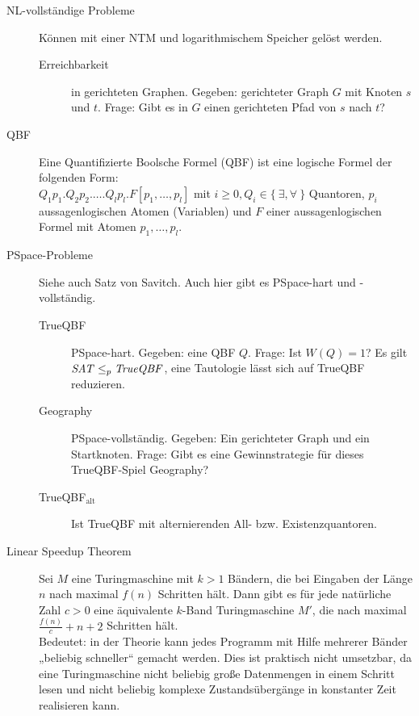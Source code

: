 \begin{description}
        \item[NL-vollständige Probleme] Können mit einer NTM und logarithmischem Speicher gelöst werden.
            \begin{description}
                \item[Erreichbarkeit] in gerichteten Graphen. Gegeben: gerichteter Graph $G$ mit Knoten $s$ und $t$. Frage: Gibt es in $G$ einen gerichteten Pfad von $s$ nach $t$?
            \end{description}

        \item[QBF] Eine Quantifizierte Boolsche Formel (QBF) ist eine logische Formel der folgenden Form: \\
            $Q_{1}p_{1}.Q_{2}p_{2}.\dots.Q_{l}p_{l}.F[p_{1},\dots,p_{l}]$ mit $i \geq 0, Q_{i} \in \{\ \exists, \forall\ \}$ Quantoren, $p_{i}$ aussagenlogischen Atomen (Variablen) und $F$ einer aussagenlogischen Formel mit Atomen $p_{1},\dots,p_{l}$. 

        \item[PSpace-Probleme] Siehe auch Satz von Savitch. Auch hier gibt es PSpace-hart und -vollständig. 
            \begin{description}
                \item[TrueQBF] PSpace-hart. Gegeben: eine QBF $Q$. Frage: Ist $W(Q) = 1$? Es gilt $\mathit{SAT} \leq_{p} \mathit{TrueQBF}$, eine Tautologie lässt sich auf TrueQBF reduzieren.
                \item[Geography] PSpace-vollständig. Gegeben: Ein gerichteter Graph und ein Startknoten. Frage: Gibt es eine Gewinnstrategie für dieses TrueQBF-Spiel Geography?
                \item[TrueQBF$_{\text{alt}}$] Ist TrueQBF mit alternierenden All- bzw. Existenzquantoren.
            \end{description}

        \item[Linear Speedup Theorem] Sei $M$ eine Turingmaschine mit $k > 1$ Bändern, die bei Eingaben der Länge $n$ nach maximal $f(n)$ Schritten hält. Dann gibt es für jede natürliche Zahl $c > 0$ eine äquivalente $k$-Band Turingmaschine $M'$, die nach maximal $\frac{f(n)}{c} + n + 2$ Schritten hält. \\
        Bedeutet: in der Theorie kann jedes Programm mit Hilfe mehrerer Bänder „beliebig schneller“ gemacht werden. Dies ist praktisch nicht umsetzbar, da eine Turingmaschine nicht beliebig große Datenmengen in einem Schritt lesen und nicht beliebig komplexe Zustandsübergänge in konstanter Zeit realisieren kann.


\end{description}

